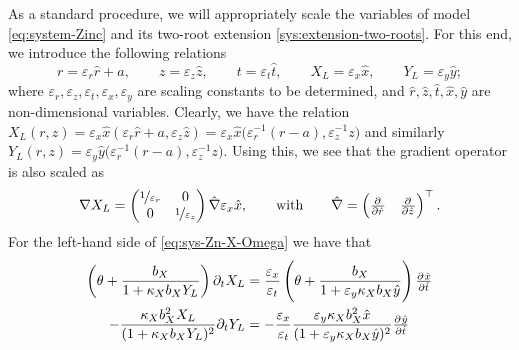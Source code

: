 \documentclass[11pt]{article}
\numberwithin{equation}{section}
\begin{document}
As a standard procedure,
we will appropriately scale the variables of model \eqref{eq:system-Zinc} and its two-root extension \eqref{sys:extension-two-roots}. For this end, we introduce the following relations
\[
    r = \varepsilon_r \hat{r} + a,
    \qquad
    z = \varepsilon_z \hat{z},
    \qquad
    t = \varepsilon_t \hat{t},
    \qquad
    X_L = \varepsilon_x \hat{x},
    \qquad
    Y_L = \varepsilon_y \hat{y};
\]
where \( \varepsilon_r, \varepsilon_z, \varepsilon_t, \varepsilon_x, \varepsilon_y\) are scaling constants to be determined, and \(\hat{r}, \hat z, \hat t, \hat x, \hat y\) are non-dimensional variables.
Clearly, we have the relation \(X_L(r,z) = \varepsilon_x \hat{x} (\varepsilon_r \hat r + a, \varepsilon_z \hat z) = \varepsilon_x \hat{x} \big( \varepsilon_r^{-1} (r-a) , \varepsilon_z^{-1} z\big) \) and similarly \(Y_L (r,z) = \varepsilon_y \hat{y} \big( \varepsilon_r^{-1} (r-a), \varepsilon_z^{-1} z \big)\). Using this, we see that the gradient operator is also scaled as
\[
    \nabla X_L =
    \begin{pmatrix}
        \nicefrac{1}{\varepsilon_r} & 0 \\
        0 & \nicefrac{1}{\varepsilon_z}
    \end{pmatrix}
    \hat{\nabla} \varepsilon_x \hat{x},
    \qquad \text{with} \qquad
    \hat{\nabla} = 
    \begin{pmatrix}
        \pd{ }{\hat r}
        &
        \pd{ }{\hat z}
    \end{pmatrix}^\top .
\]
For the left-hand side of \eqref{eq:sys-Zn-X-Omega} we have that
\begin{align}
    \left( \theta + \frac{b_X}{1 + \kappa_X b_X Y_L} \right) \partial_t X_L &= \frac{\varepsilon_x}{\varepsilon_t} \left( \theta + \frac{b_X}{1 + \varepsilon_y \kappa_X b_X \hat{y}} \right)  \pd{\hat{x}}{\hat{t}}
    \\
    - \frac{\kappa_X b_X^2 X_L}{(1+\kappa_X b_X Y_L)^2} \partial_t Y_L &=
    -\frac{\varepsilon_x}{\varepsilon_t} \frac{\varepsilon_y \kappa_X b_X^2 \hat{x}}{(1+ \varepsilon_y\kappa_X b_X \hat{y})^2} \pd{\hat y}{\hat t}
\end{align}
\end{document}
